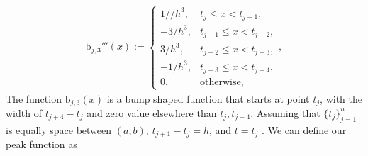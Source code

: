 \documentclass{iitthesis}
\theoremstyle{definition}
\theoremstyle{remark}
\begin{document}
\begin{align*}
  \text{b}_{j,3}'''(x):= \begin{cases} \displaystyle 1//h^3, & t_{j} \le x < t_{j+1},\\[1ex]
\displaystyle -3/h^3, & t_{j+1} \le x < t_{j+2},\\[1ex]
\displaystyle 3/h^3, & t_{j+2} \le x < t_{j+3},\\[1ex]
\displaystyle -1/h^3, & t_{j+3} \le x < t_{j+4},\\[1ex]
\displaystyle  0, & \text{otherwise},
\end{cases},
\end{align*}
The function $\text{b}_{j,3}(x)$ is a bump shaped function that starts at point $t_j$, with the width of $t_{j+4}-t_{j}$ and zero value elsewhere than $t_{j}, t_{j+4}$. Assuming that $\{t_{j}\}_{j=1}^{n}$ is equally space between $(a,b)$, $t_{j+1}-t_{j}=h$, and $t=t_{j}$ . We can define our peak function as
\end{document}
